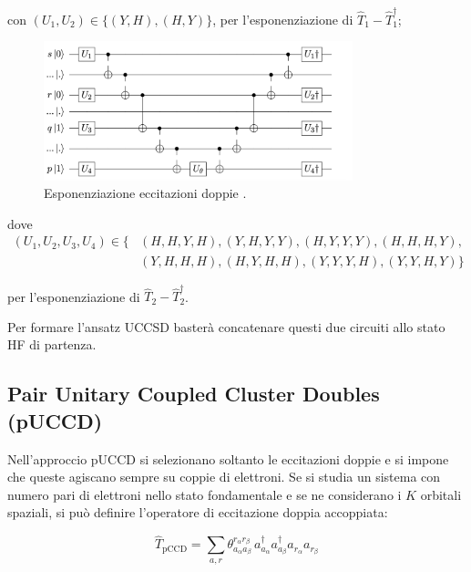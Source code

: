 con $(U_1,U_2)\in\{(Y,H),(H,Y)\}$, per l'esponenziazione di $\hat{T}_1-\hat{T}_{1}^{\dagger}$;

\begin{figure}[H]
    \centering
    \hspace{0.5cm}
    \includegraphics[width=0.8\textwidth]{Immagini/Capitolo_2/ucc_doubles.png}
    \caption{Esponenziazione eccitazioni doppie \cite{Carobene_2021}.}
    \label{fig:eccitazioni-doppie}
\end{figure} 

dove 
\begin{align*}
    (U_1,U_2,U_3,U_4)\in\{&(H,H,Y,H),(Y,H,Y,Y),(H,Y,Y,Y),(H,H,H,Y),\\
    &(Y,H,H,H),(H,Y,H,H),(Y,Y,Y,H),(Y,Y,H,Y)\}
\end{align*}

per l'esponenziazione di $\hat{T}_2-\hat{T}_{2}^{\dagger}$.

Per formare l'ansatz UCCSD basterà concatenare questi due circuiti allo stato HF di partenza.

\subsection{Pair Unitary Coupled Cluster Doubles (pUCCD)}\label{subsec:pUCCD}

Nell'approccio pUCCD si selezionano soltanto le eccitazioni doppie e si impone che queste agiscano sempre su coppie di elettroni. Se si studia un sistema con numero pari di elettroni nello stato fondamentale e se ne considerano i $K$ orbitali spaziali, si può definire l'operatore di eccitazione doppia accoppiata:

\begin{equation}\label{eqn:operatore-paired-cluster}
    \hat{T}_{\text{pCCD}} = \sum_{a,r} 
    \theta_{a_\alpha a_\beta}^{r_\alpha r_\beta}\,
    a^{\dagger}_{a_\alpha} a^{\dagger}_{a_\beta} a_{r_\alpha} a_{r_\beta}
\end{equation}

